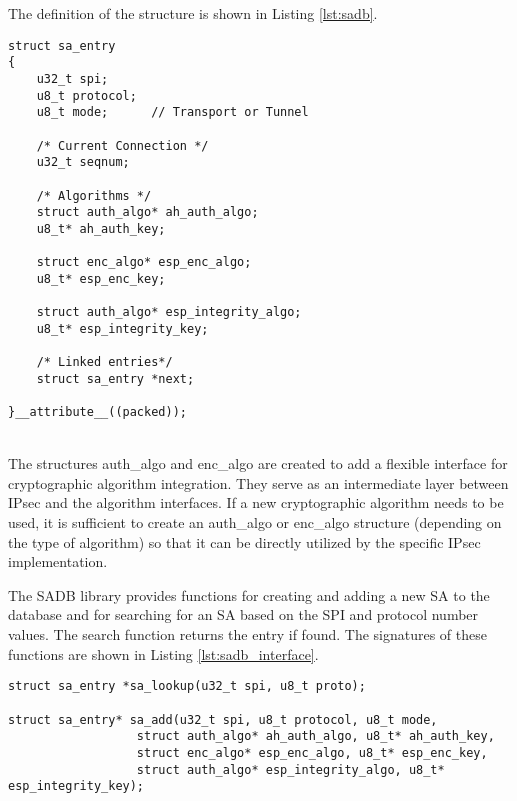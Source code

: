 \noindent
The definition of the structure is shown in Listing \ref{lst:sadb}.\\

\noindent
\begin{minipage}{\linewidth}
\begin{lstlisting}[style=mycodestyle, label={lst:sadb}, caption={The SADB entry structure}]
struct sa_entry
{
	u32_t spi;
	u8_t protocol;	
	u8_t mode;		// Transport or Tunnel
	
	/* Current Connection */
	u32_t seqnum; 
	
	/* Algorithms */
	struct auth_algo* ah_auth_algo;
	u8_t* ah_auth_key;
	
	struct enc_algo* esp_enc_algo;
	u8_t* esp_enc_key;
	
	struct auth_algo* esp_integrity_algo;
	u8_t* esp_integrity_key;
	
	/* Linked entries*/
	struct sa_entry *next;

}__attribute__((packed));
\end{lstlisting}
\end{minipage}\\

The structures auth\_algo and enc\_algo are created to add a flexible interface for cryptographic algorithm integration. They serve as an intermediate layer between IPsec and the algorithm interfaces. If a new cryptographic algorithm needs to be used, it is sufficient to create an auth\_algo or enc\_algo structure (depending on the type of algorithm) so that it can be directly utilized by the specific IPsec implementation.

The SADB library provides functions for creating and adding a new SA to the database and for searching for an SA based on the SPI and protocol number values. The search function returns the entry if found. The signatures of these functions are shown in Listing \ref{lst:sadb_interface}.\\

\noindent
\begin{minipage}{\linewidth}
\begin{lstlisting}[style=mycodestyle, label={lst:sadb_interface}, caption={The SADB interface}]
struct sa_entry *sa_lookup(u32_t spi, u8_t proto);

struct sa_entry* sa_add(u32_t spi, u8_t protocol, u8_t mode, 
				  struct auth_algo* ah_auth_algo, u8_t* ah_auth_key,
				  struct enc_algo* esp_enc_algo, u8_t* esp_enc_key,
				  struct auth_algo* esp_integrity_algo, u8_t* esp_integrity_key);
\end{lstlisting}
\end{minipage}\\

